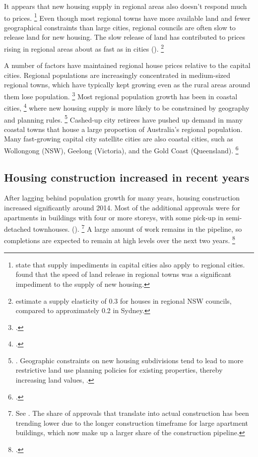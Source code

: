It appears that new housing supply in regional areas also doesn't respond much to prices.%
    \footnote{\textcite{HsiehEtAlSupply2012} state that supply impediments in capital cities also apply to regional cities. \textcites[][11]{BeerEtAl2011drivers} found that the speed of land release in regional towns was a significant impediment to the supply of new housing.}
Even though most regional towns have more available land and fewer geographical constraints than large cities, regional councils are often slow to release land for new housing.
The slow release of land has contributed to prices rising in regional areas about as fast as in cities ().%
	\footnote{\textcite{Liu-Otto-2014-Housing-supply-elasticity-Regional-NSW} estimate a supply elasticity of 0.3 for houses in regional NSW councils, compared to approximately 0.2 in Sydney.}

A number of factors have maintained regional house prices relative to the capital cities.
Regional populations are increasingly concentrated in medium-sized regional towns, which have typically kept growing even as the rural areas around them lose population.%
	\footcite[][21]{DaleyWoodChivers2017RegPatterns}
Most regional population growth has been in coastal cities,%
	\footcite[][23]{DaleyWoodChivers2017RegPatterns}
where new housing supply is more likely to be constrained by geography and planning rules.%
    \footnote{\textcite{Beer2017Housing}. Geographic constraints on new housing subdivisions tend to lead to more restrictive land use planning policies for existing properties, thereby increasing land values, \textcite[][1286]{Saiz2010Geog}.}
Cashed-up city retirees have pushed up demand in many coastal towns that house a large proportion of Australia's regional population.
Many fast-growing capital city satellite cities are also coastal cities, such as Wollongong (NSW), Geelong (Victoria), and the Gold Coast (Queensland).%
	\footcites[][10]{DaleyLancy2011-Investing-regions}{DaleyWoodChivers2017RegPatterns}

\subsection{Housing construction increased in recent years}\label{subsec:housing-construction-increased-in-recent-years}

After lagging behind population growth for many years, housing construction increased significantly around 2014.
Most of the additional approvals were for apartments in buildings with four or more storeys, with some pick-up in semi-detached townhouses. ().%
	\footnote{See \textcite{Shoory2016Apartment}.
	The share of approvals that translate into actual construction has been trending lower due to the longer construction timeframe for large apartment buildings, which now make up a larger share of the construction pipeline.}
A large amount of work remains in the pipeline, so completions are expected to remain at high levels over the next two years.%
    \footcites{ShooryRosewall2017}[][62]{RBAStatementonMonetaryPolicyAug17}[][Graph~2.9]{RBAFinancialStabilityOct2017}

